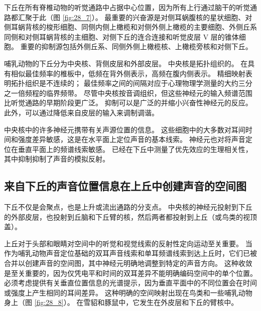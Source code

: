 下丘在所有脊椎动物的听觉通路中占据中心位置，因为所有上行通过脑干的听觉通路都汇聚于此（图 \ref{fig:28_7}）。
最重要的兴奋源是对侧耳蜗腹核的星状细胞、对侧耳蜗背核的梭形细胞、同侧内侧上橄榄和对侧外侧上橄榄的主要细胞、外侧丘系同侧和对侧耳蜗背核的主细胞、对侧下丘的连合连接和听觉皮层 V 层的锥体细胞。
重要的抑制源包括外侧丘系、同侧外侧上橄榄核、上橄榄旁核和对侧下丘。


哺乳动物的下丘分为中央核、背侧皮层和外部皮层。
中央核是拓扑组织的。 
在具有相似最佳频率的椎板中，低频在背外侧表示，高频在腹内侧表示。
精细映射表明拓扑组织是不连续的； 
最佳频率之间的间隔对应于心理物理学测量的大约三分之一倍频程的临界频带。
尽管中央核按音调组织，但这些神经元的输入频谱范围比听觉通路的早期阶段更广泛。
抑制可以是广泛的并缩小兴奋性神经元的反应。
此外，可以通过降低来自皮层的输入来调制调谐。


中央核中的许多神经元携带有关声源位置的信息。
这些细胞中的大多数对耳间时间和强度差异敏感，这是在水平面上定位声音的基本线索。
神经元也对将声音定位在垂直平面上的频谱线索敏感。
已经在下丘中测量了优先效应的生理相关性，其中抑制抑制了声音的模拟反射。




\subsection{来自下丘的声音位置信息在上丘中创建声音的空间图}

下丘不仅是会聚点，也是上升或流出通路的分支点。
中央核的神经元投射到下丘的外部皮层，也投射到丘脑和下丘臂的核，然后两者都投射到上丘（或鸟类的视顶盖）。


上丘对于头部和眼睛对空间中的听觉和视觉线索的反射性定向运动至关重要。
当作为哺乳动物声音定位基础的双耳声音线索和单耳频谱线索到达上丘时，它们已被合并以创建声音的空间图，其中神经元明确地调整到特定的声音方向。
这种收敛是至关重要的，因为仅凭电平和时间的双耳差异不能明确编码空间中的单个位置。
必须考虑提供有关垂直位置信息的光谱提示，因为垂直平面中的不同位置会在时间或强度上产生相同的耳间差异。
这种明确的空间映射出现在鸟类和一些哺乳动物身上（图 \ref{fig:28_8}）。 
在雪貂和豚鼠中，它发生在外皮层和下丘的臂核中。


